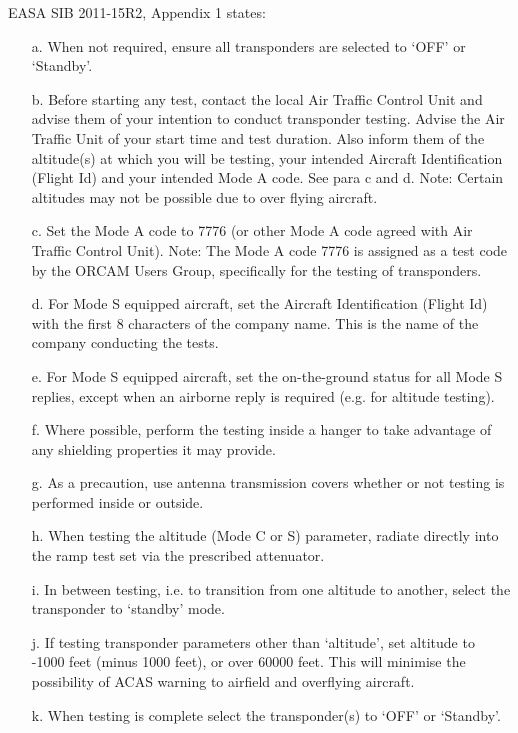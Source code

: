 \documentclass[a4paper]{article}
\begin{document}
EASA SIB 2011-15R2, Appendix 1 states:
\begin{itemize}
\item[a.]{When not required, ensure all transponders are selected to ‘OFF’ or ‘Standby’.}
\item[b.]{Before starting any test, contact the local Air Traffic Control Unit and advise them of your intention to conduct transponder testing. Advise the Air Traffic Unit of your start time and test duration. Also inform them of the altitude(s) at which you will be testing, your intended Aircraft Identification (Flight Id) and your intended Mode A code. See para c and d. Note: Certain altitudes may not be possible due to over flying aircraft.}
\item[c.]{Set the Mode A code to 7776 (or other Mode A code agreed with Air Traffic Control Unit). Note: The Mode A code 7776 is assigned as a test code by the ORCAM Users Group, specifically for the testing of transponders.}
\item[d.]{For Mode S equipped aircraft, set the Aircraft Identification (Flight Id) with the first 8 characters of the company name. This is the name of the company conducting the tests.}
\item[e.]{For Mode S equipped aircraft, set the on-the-ground status for all Mode S replies, except when an airborne reply is required (e.g. for altitude testing).}
\item[f.]{Where possible, perform the testing inside a hanger to take advantage of any shielding properties it may provide.}
\item[g.]{As a precaution, use antenna transmission covers whether or not testing is performed inside or outside.}
\item[h.]{When testing the altitude (Mode C or S) parameter, radiate directly into the ramp test set via the prescribed attenuator.}
\item[i.]{In between testing, i.e. to transition from one altitude to another, select the transponder to ‘standby’ mode.}
\item[j.]{If testing transponder parameters other than ‘altitude’, set altitude to -1000 feet (minus 1000 feet), or over 60000 feet. This will minimise the possibility of ACAS warning to airfield and overflying aircraft.}
\item[k.]{When testing is complete select the transponder(s) to ‘OFF’ or ‘Standby’.}
\end{itemize}




\end{document}
